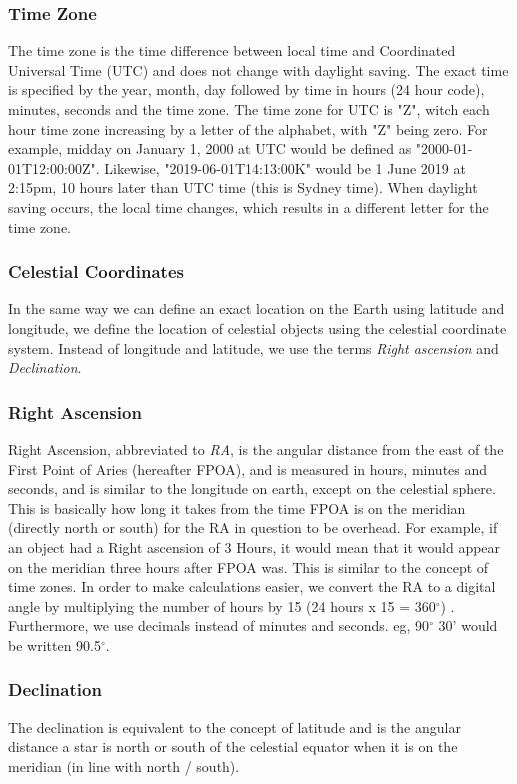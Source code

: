\subsubsection{Time Zone}
The time zone is the time difference between local time and Coordinated Universal Time (UTC) and does not change with daylight saving. The exact time is specified by the year, month, day followed by time in hours (24 hour code), minutes, seconds and the time zone.  The time zone for UTC is "Z", witch each hour time zone increasing by a letter of the alphabet, with "Z" being zero. For example,   midday on January 1, 2000 at UTC would be defined as "2000-01-01T12:00:00Z". Likewise, "2019-06-01T14:13:00K" would be 1 June 2019 at 2:15pm, 10 hours later than UTC time (this is Sydney time). When daylight saving occurs, the local time changes, which results in a different letter for the time zone.


\subsubsection{Celestial Coordinates}
In the same way we can define an exact location on the Earth using latitude and longitude, we define the location of celestial objects using the celestial coordinate system. Instead of longitude and latitude, we use the terms \textit{Right ascension} and \textit{Declination}. 

\subsubsection{Right Ascension}
Right Ascension, abbreviated to \textit{RA}, is the angular distance from the east of the First Point of Aries (hereafter FPOA), and is measured in hours, minutes and seconds, and is similar to the longitude on earth, except on the celestial sphere. This is basically how long it takes from the time FPOA is on the meridian (directly north or south) for the RA in question to be overhead. For example, if an object had a Right ascension of 3 Hours, it would mean that it would appear on the meridian three hours after FPOA was.  This is similar to the concept of time zones. In order to make calculations easier, we convert the RA to a digital angle by multiplying the number of hours by 15 (24 hours x 15 = 360$^{\circ}$) . Furthermore, we use decimals instead of minutes and seconds. eg, 90$^{\circ}$ 30' would be written 90.5$^{\circ}$. 

\subsubsection{Declination}
The declination is equivalent to the concept of latitude and is the angular distance a star is north or south of the celestial equator when it is on the meridian (in line with north / south).  

